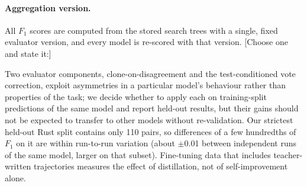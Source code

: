 \paragraph{Aggregation version.} All $F_1$ scores are computed from the
stored search trees with a single, fixed evaluator version, and every model
is re-scored with that version. [Choose one and state it:]


Two evaluator components, clone-on-disagreement and the test-conditioned vote
correction, exploit asymmetries in a particular model's behaviour rather than
properties of the task; we decide whether to apply each on training-split
predictions of the same model and report held-out results, but their gains
should not be expected to transfer to other models without re-validation.
Our strictest held-out Rust split contains only 110 pairs, so differences of
a few hundredths of $F_1$ on it are within run-to-run variation (about $\pm$0.01
between independent runs of the same model, larger on that subset).
Fine-tuning data that includes teacher-written trajectories measures the
effect of distillation, not of self-improvement alone.
